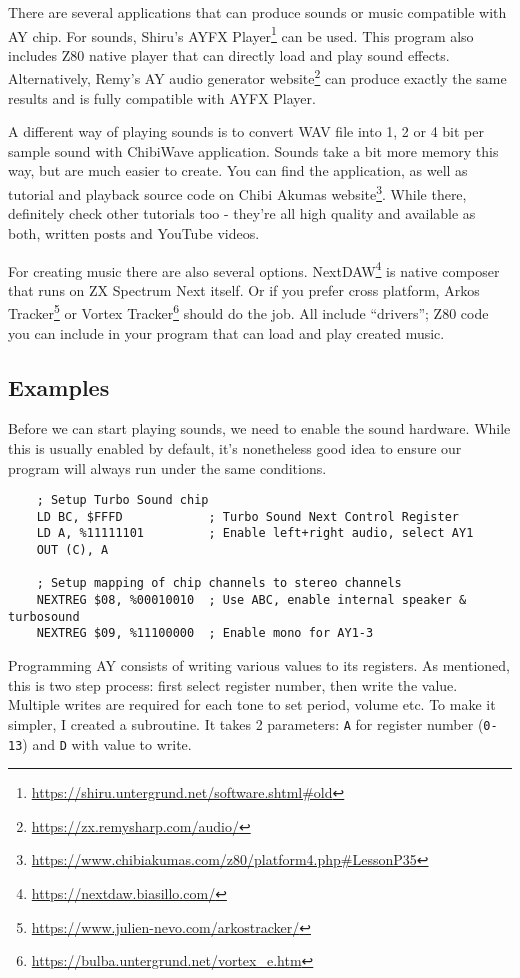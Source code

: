 There are several applications that can produce sounds or music compatible with AY chip. For sounds, Shiru's AYFX Player\footnote{\url{https://shiru.untergrund.net/software.shtml#old}} can be used. This program also includes Z80 native player that can directly load and play sound effects. Alternatively, Remy's AY audio generator website\footnote{\url{https://zx.remysharp.com/audio/}} can produce exactly the same results and is fully compatible with AYFX Player.

A different way of playing sounds is to convert WAV file into 1, 2 or 4 bit per sample sound with ChibiWave application. Sounds take a bit more memory this way, but are much easier to create. You can find the application, as well as tutorial and playback source code on Chibi Akumas website\footnote{\url{https://www.chibiakumas.com/z80/platform4.php#LessonP35}}. While there, definitely check other tutorials too - they're all high quality and available as both, written posts and YouTube videos.

For creating music there are also several options. NextDAW\footnote{\url{https://nextdaw.biasillo.com/}} is native composer that runs on ZX Spectrum Next itself. Or if you prefer cross platform, Arkos Tracker\footnote{\url{https://www.julien-nevo.com/arkostracker/}} or Vortex Tracker\footnote{\url{https://bulba.untergrund.net/vortex_e.htm}} should do the job. All include ``drivers''; Z80 code you can include in your program that can load and play created music.


\pagebreak
\subsection{Examples}

Before we can start playing sounds, we need to enable the sound hardware. While this is usually enabled by default, it's nonetheless good idea to ensure our program will always run under the same conditions.

\begin{lstlisting}
    ; Setup Turbo Sound chip
    LD BC, $FFFD            ; Turbo Sound Next Control Register
    LD A, %11111101         ; Enable left+right audio, select AY1
    OUT (C), A
	
    ; Setup mapping of chip channels to stereo channels
    NEXTREG $08, %00010010  ; Use ABC, enable internal speaker & turbosound
    NEXTREG $09, %11100000  ; Enable mono for AY1-3
\end{lstlisting}

Programming AY consists of writing various values to its registers. As mentioned, this is two step process: first select register number, then write the value. Multiple writes are required for each tone to set period, volume etc. To make it simpler, I created a subroutine. It takes 2 parameters: {\tt A} for register number ({\tt 0-13}) and {\tt D} with value to write.

